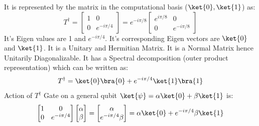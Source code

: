 \documentclass[12pt, oneside]{book}
\theoremstyle{definition}
\theoremstyle{definition}
\theoremstyle{remark}
\begin{document}
It is represented by the matrix in the computational basis ($\ket{0},\ket{1}$) as:
\[
    T^{\dagger}=\begin{bmatrix}
        1 & 0 \\
        0 & e^{-i\pi/4}
    \end{bmatrix}=e^{-i\pi/8}\begin{bmatrix}
        e^{i\pi/8} & 0 \\
        0 & e^{-i\pi/8}
    \end{bmatrix}
\]
It's Eigen values are 1 and $e^{-i\pi/4}$. It's corresponding Eigen vectors are $\ket{0}$ and $\ket{1}$.
It is a Unitary and Hermitian Matrix. It is a Normal Matrix hence Unitarily Diagonalizable.
It has a Spectral decomposition (outer product representation) which can be written as:
\[
    T^{\dagger}=\ket{0}\bra{0}+e^{-i\pi/4}\ket{1}\bra{1}
\]
Action of $T^{\dagger}$ Gate on a general qubit $\ket{\psi}=\alpha\ket{0}+\beta\ket{1}$ is:
\[
    \begin{bmatrix}
        1 & 0 \\
        0 & e^{-i\pi/4}
    \end{bmatrix}\begin{bmatrix}
        \alpha \\
        \beta
    \end{bmatrix}=\begin{bmatrix}
        \alpha \\
        e^{-i\pi/4}\beta
    \end{bmatrix}=\alpha\ket{0}+e^{-i\pi/4}\beta\ket{1}
\]
\end{document}
